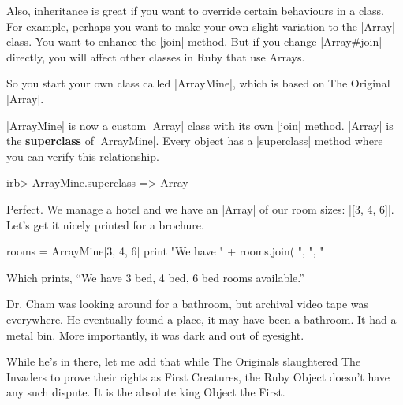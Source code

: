 \documentclass[12pt,twoside]{report}
\begin{document}
Also, inheritance is great if you want to override certain behaviours
in a class. For example, perhaps you want to make your own slight
variation to the \rubyinline|Array| class. You want to
enhance the \rubyinline|join| method.  But if you
change \rubyinline|Array#join| directly, you will
affect other classes in Ruby that use Arrays.

So you start your own class called
\rubyinline|ArrayMine|, which is based on The Original
\rubyinline|Array|.




\rubyinline|ArrayMine| is now a custom
\rubyinline|Array| class with its own
\rubyinline|join| method.
\rubyinline|Array| is the {\bf superclass} of
\rubyinline|ArrayMine|.  Every object has a
\rubyinline|superclass| method where you can verify
this relationship.


\begin{consolecode}

 irb> ArrayMine.superclass
   => Array

\end{consolecode}


Perfect.  We manage a hotel and we have an
\rubyinline|Array| of our room sizes:
\rubyinline|[3, 4, 6]|. Let's get it nicely printed
for a brochure.


\begin{rubycode}

 rooms = ArrayMine[3, 4, 6]
 print "We have " + rooms.join( ", ", "%

\end{rubycode}


Which prints, ``We have 3 bed, 4 bed, 6 bed rooms available.''

Dr. Cham was looking around for a bathroom, but archival video tape
was everywhere. He eventually found a place, it may have been a
bathroom.  It had a metal bin. More importantly, it was dark and out
of eyesight.

While he's in there, let me add that while The Originals slaughtered
The Invaders to prove their rights as First Creatures, the Ruby Object
doesn't have any such dispute.  It is the absolute king Object the
First.
\end{document}
